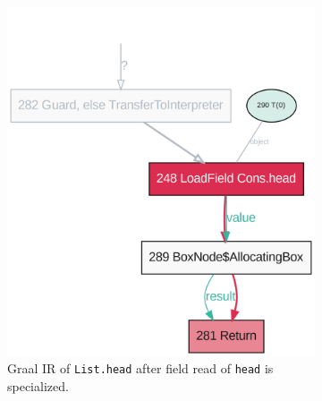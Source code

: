\begin{figure}[!htb]
	\centering
	\begin{subfigure}[b]{0.4\textwidth}
		\centering
		\includegraphics[width=\textwidth]{figures/dot/List.head.specialized.TruffleTier.png}
		\caption{Graal IR of \texttt{List.head} after field read of \texttt{head} is specialized.}
		\label{graalir:cons-head-specialized}
	\end{subfigure}
	\hfill
	\begin{subfigure}[b]{0.4\textwidth}
		\centering

\end{subfigure}
\end{figure}
